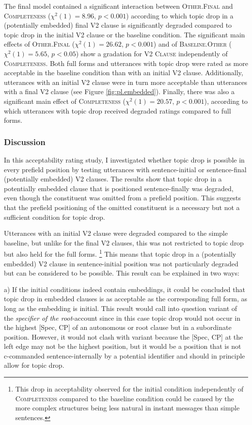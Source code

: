 \noindent
The final model contained a significant interaction between \textsc{Other.Final} and \textsc{Completeness} ($\chi^2(1) = 8.96$, $p < 0.001$) according to which topic drop in a (potentially embedded) final V2 clause is significantly degraded compared to topic drop in the initial V2 clause or the baseline condition.
The significant main effects of \textsc{Other.Final} ($\chi^2(1) = 26.62$, $p < 0.001$) and of \textsc{Baseline.Other} ($\chi^2(1) = 5.65$, $p < 0.05$) show a gradation for \textsc{V2 Clause} independently of \textsc{Completeness}.
Both full forms and utterances with topic drop were rated as more acceptable in the baseline condition than with an initial V2 clause.
Additionally, utterances with an initial V2 clause were in turn more acceptable than utterances with a final V2 clause (see Figure \ref{fig:pl.embedded}).
Finally, there was also a significant main effect of \textsc{Completeness} ($\chi^2(1) = 20.57$, $p < 0.001$), according to which utterances with topic drop received degraded ratings compared to full forms.

\subsubsection{Discussion}\label{sec:exp.embedded.discussion}
In this acceptability rating study, I investigated whether topic drop is possible in every prefield position by testing utterances with sentence-initial or sentence-final (potentially embedded) V2 clauses.
The results show that topic drop in a potentially embedded clause that is positioned sentence-finally was degraded, even though the constituent was omitted from a prefield position.
This suggests that the prefield positioning of the omitted constituent is a necessary but not a sufficient condition for topic drop.

Utterances with an initial V2 clause were degraded compared to the simple baseline, but unlike for the final V2 clauses, this was not restricted to topic drop but also held for the full forms.%
%
\footnote{This drop in acceptability observed for the initial condition independently of \textsc{Completeness} compared to the baseline condition could be caused by the more complex structures being less natural in instant messages than simple sentences.}
%
This means that topic drop in a (potentially embedded) V2 clause in sentence-initial position was not particularly degraded but can be considered to be possible.
This result can be explained in two ways:

a) If the initial conditions indeed contain embeddings, it could be concluded that topic drop in embedded clauses is as acceptable as the corresponding full form, as long as the embedding is initial.
This result would call into question  variant of the \textit{specifier of the root}-account since in this case topic drop would not occur in the highest [Spec, CP] of an autonomous or root clause but in a subordinate position.
However, it would not clash with  variant because the [Spec, CP] at the left edge may not be the highest position, but it would be a position that is not c-commanded  sentence-internally by a potential identifier and should in principle allow for topic drop.

